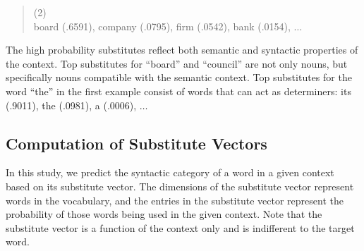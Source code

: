 \begin{quote}
  (2) \\
  board (.6591), company (.0795), firm (.0542), bank (.0154), $\ldots$
\end{quote}

The high probability substitutes reflect both semantic and syntactic
properties of the context.  Top substitutes for ``board'' and
``council'' are not only nouns, but specifically nouns compatible with
the semantic context.  Top substitutes for the word ``the'' in the
first example consist of words that can act as determiners: its
(.9011), the (.0981), a (.0006), $\ldots$



\subsection{Computation of Substitute Vectors}
\label{sec:subcomp}

In this study, we predict the syntactic category of a word in a given
context based on its substitute vector.  The dimensions of the
substitute vector represent words in the vocabulary, and the entries
in the substitute vector represent the probability of those words
being used in the given context.  Note that the substitute vector is a
function of the context only and is indifferent to the target word.

